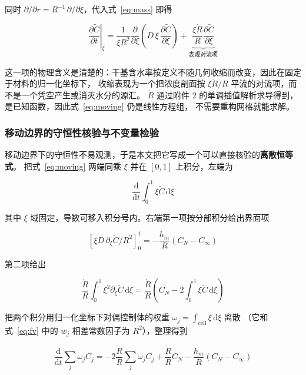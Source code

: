 
同时 $\partial/\partial r=R^{-1}\,\partial/\partial\xi$，代入式~\eqref{eq:mass} 即得

\begin{equation}
\left.\frac{\partial \tilde C}{\partial t}\right|_\xi
=\frac{1}{\xi R^2}\frac{\partial}{\partial \xi}\left(D\,\xi\,\frac{\partial \tilde C}{\partial \xi}\right)
+\underbrace{\frac{\xi\dot R}{R}\frac{\partial \tilde C}{\partial \xi}}_{\text{表观对流项}}
\label{eq:moving}
\end{equation}


这一项的物理含义是清楚的：干基含水率按定义不随几何收缩而改变，因此在固定于材料的归一化坐标下，
收缩表现为一个把浓度剖面按 $\xi\dot R/R$ 平流的对流项，而不是一个凭空产生或消灭水分的源汇。
$\dot R$ 通过附件 2 的单调插值解析求导得到，是已知函数，因此式~\eqref{eq:moving} 仍是线性方程组，
不需要重构网格就能求解。

\subsubsection{移动边界的守恒性核验与不变量检验}


移动边界下的守恒性不易观测，于是本文把它写成一个可以直接核验的\textbf{离散恒等式}。
把式~\eqref{eq:moving} 两端同乘 $\xi$ 并在 $[0,1]$ 上积分，左端为

\[
\frac{\mathrm{d}}{\mathrm{d}t}\int_0^1\xi\tilde C\,\mathrm{d}\xi
\]

其中 $\xi$ 域固定，导数可移入积分号内。右端第一项按分部积分给出界面项

\[
\left[\xi D\,\partial_\xi\tilde C/R^2\right]_0^1
=-\frac{h_m}{R}(C_N-C_\infty)
\]

第二项给出

\[
\frac{\dot R}{R}\int_0^1\xi^2\partial_\xi\tilde C\,\mathrm{d}\xi
=\frac{\dot R}{R}\left(C_N-2\int_0^1\xi\tilde C\,\mathrm{d}\xi\right)
\]

把两个积分用归一化坐标下对偶控制体的权重 $\omega_j=\int_{\text{cell}}\xi\,\mathrm{d}\xi$ 离散
（它和式~\eqref{eq:fv} 中的 $w_j$ 相差常数因子为 $R^2$），整理得到

\begin{equation}
\frac{\mathrm{d}}{\mathrm{d}t}\sum_j \omega_jC_j
=-2\frac{\dot R}{R}\sum_j \omega_jC_j+\frac{\dot R}{R}C_N-\frac{h_m}{R}\left(C_N-C_\infty\right)
\label{eq:conservation}
\end{equation}

